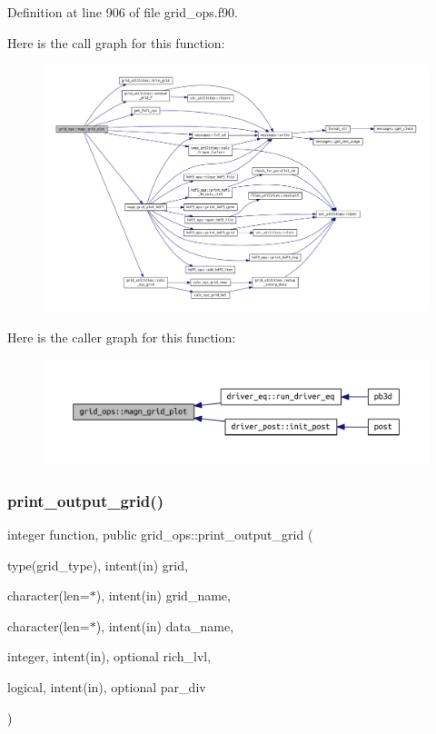 Definition at line 906 of file grid\+\_\+ops.\+f90.

Here is the call graph for this function\+:
\nopagebreak
\begin{figure}[H]
\begin{center}
\leavevmode
\includegraphics[width=350pt]{namespacegrid__ops_addd76b7b3be0b51e0863ae0cdfef41e6_cgraph}
\end{center}
\end{figure}
Here is the caller graph for this function\+:
\nopagebreak
\begin{figure}[H]
\begin{center}
\leavevmode
\includegraphics[width=350pt]{namespacegrid__ops_addd76b7b3be0b51e0863ae0cdfef41e6_icgraph}
\end{center}
\end{figure}
\mbox{\label{namespacegrid__ops_ab2a8efa54d36500efcabeb9f1aabbcc6}} 
\subsubsection{\texorpdfstring{print\+\_\+output\+\_\+grid()}{print\_output\_grid()}}
{\footnotesize\ttfamily integer function, public grid\+\_\+ops\+::print\+\_\+output\+\_\+grid (\begin{DoxyParamCaption}\item[{type(grid\+\_\+type), intent(in)}]{grid,  }\item[{character(len=$\ast$), intent(in)}]{grid\+\_\+name,  }\item[{character(len=$\ast$), intent(in)}]{data\+\_\+name,  }\item[{integer, intent(in), optional}]{rich\+\_\+lvl,  }\item[{logical, intent(in), optional}]{par\+\_\+div }\end{DoxyParamCaption})}



